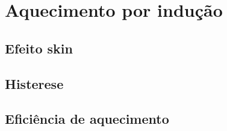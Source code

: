 \section{Aquecimento por indução}
\subsection{Efeito skin}
\subsection{Histerese}
\subsection{Eficiência de aquecimento} %